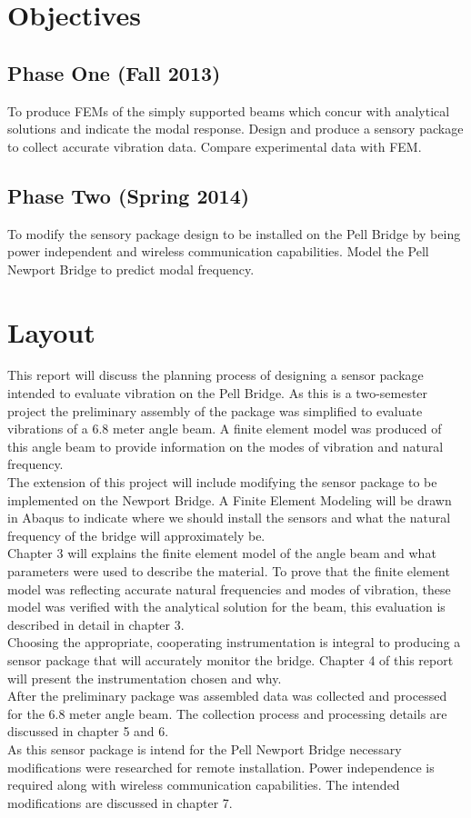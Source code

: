\section{Objectives}
\subsection{Phase One (Fall 2013)}
\indent To produce FEMs of the simply supported beams which concur with analytical solutions and indicate the modal response. Design and produce a sensory package to collect accurate vibration data. Compare experimental data with FEM. \\
\subsection{Phase Two (Spring 2014)}
\indent To modify the sensory package design to be installed on the Pell Bridge by being power independent and wireless communication capabilities. Model the Pell Newport Bridge to predict modal frequency.\\
\section{Layout} %
This report will discuss the planning process of designing a sensor package intended to evaluate vibration on the Pell Bridge. As this is a two-semester project the preliminary assembly of the package was simplified to evaluate vibrations of a 6.8 meter angle beam. A finite element model was produced of this angle beam to provide information on the modes of vibration and natural frequency. \\
\indent The extension of this project will include modifying the sensor package to be implemented on the Newport Bridge. A Finite Element Modeling will be drawn in Abaqus to indicate where we should install the sensors and what the natural frequency of the bridge will approximately be. \\
\indent Chapter 3 will explains the finite element model of the angle beam and what parameters were used to describe the material. To prove that the finite element model was reflecting accurate natural frequencies and modes of vibration, these model was verified with the analytical solution for the beam, this evaluation is described in detail in chapter 3. \\
\indent Choosing the appropriate, cooperating instrumentation is integral to producing a sensor package that will accurately monitor the bridge. Chapter 4 of this report will present the instrumentation chosen and why. \\
\indent After the preliminary package was assembled data was collected and processed for the 6.8 meter angle beam. The collection process and processing details are discussed in chapter 5 and 6. \\ 
\indent As this sensor package is intend for the Pell Newport Bridge necessary modifications were researched for remote installation. Power independence is required along with wireless communication capabilities. The intended modifications are discussed in chapter 7. 